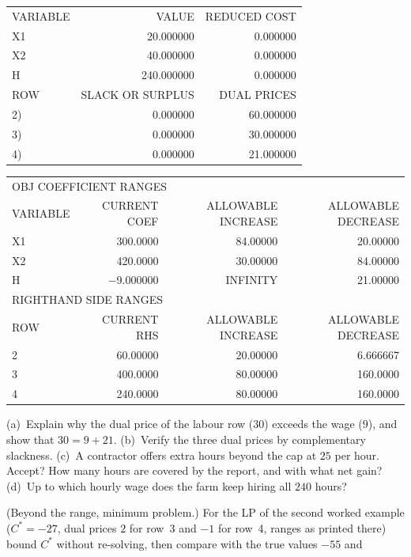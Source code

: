 \begin{problems}
\begin{center}
\begin{tabular}{lrr}
        VARIABLE & VALUE & REDUCED COST\\
        X1 & 20.000000 & 0.000000\\
        X2 & 40.000000 & 0.000000\\
        H & 240.000000 & 0.000000\\[3pt]
        ROW & SLACK OR SURPLUS & DUAL PRICES\\
        2) & 0.000000 & 60.000000\\
        3) & 0.000000 & 30.000000\\
        4) & 0.000000 & 21.000000\\
        \end{tabular}

        \medskip
        \begin{tabular}{lrrr}
        \multicolumn{4}{l}{OBJ COEFFICIENT RANGES}\\
        VARIABLE & CURRENT COEF & ALLOWABLE INCREASE & ALLOWABLE DECREASE\\
        X1 & 300.0000 & 84.00000 & 20.00000\\
        X2 & 420.0000 & 30.00000 & 84.00000\\
        H & $-$9.000000 & INFINITY & 21.00000\\[3pt]
        \multicolumn{4}{l}{RIGHTHAND SIDE RANGES}\\
        ROW & CURRENT RHS & ALLOWABLE INCREASE & ALLOWABLE DECREASE\\
        2 & 60.00000 & 20.00000 & 6.666667\\
        3 & 400.0000 & 80.00000 & 160.0000\\
        4 & 240.0000 & 80.00000 & 160.0000\\
        \end{tabular}
        \end{center}
        (a)~Explain why the dual price of the labour row ($30$) exceeds the
        wage ($9$), and show that $30=9+21$. (b)~Verify the three dual
        prices by complementary slackness. (c)~A contractor offers extra
        hours beyond the cap at $25$ per hour. Accept? How many hours are
        covered by the report, and with what net gain? (d)~Up to which
        hourly wage does the farm keep hiring all $240$ hours?
  \item (Beyond the range, minimum problem.) For the LP of the second
        worked example ($C^{*}=-27$, dual prices $2$ for row~3 and $-1$
        for row~4, ranges as printed there) bound $C^{*}$ without
        re-solving, then compare with the true values $-55$ and

\end{problems}
